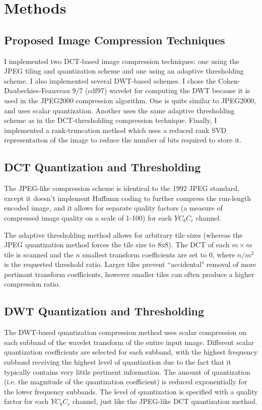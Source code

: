 \documentclass[conference]{IEEEtran}
\begin{document}
\section{Methods}

\subsection{Proposed Image Compression Techniques}

I implemented two DCT-based image compression techniques: one using the JPEG tiling and quantization scheme and one using an adaptive thresholding scheme.
I also implemented several DWT-based schemes.
I chose the Cohen-Daubechies-Feauveau 9/7 (cdf97) wavelet for computing the DWT because it is used in the JPEG2000 compression algorithm.
One is quite similar to JPEG2000, and uses scalar quantization.
Another uses the same adaptive thresholding scheme as in the DCT-thresholding compression technique.
Finally, I implemented a rank-truncation method which uses a reduced rank SVD representaiton of the image to reduce the number of bits required to store it.

\subsection{DCT Quantization and Thresholding}
The JPEG-like compression scheme is identical to the 1992 JPEG standard, except it doesn't implement Huffman coding to further compress the run-length encoded image, and it allows for separate quality factors (a measure of compressed image quality on a scale of 1-100) for each $YC_bC_r$ channel.

The adaptive thresholding method allows for arbitrary tile sizes (whereas the JPEG quantization method forces the tile size to 8x8).
The DCT of each $m\times m$ tile is scanned and the $n$ smallest transform coefficients are set to 0, where $n/m^2$ is the requested threshold ratio.
Larger tiles prevent ``accidental" removal of more pertinant transform coefficients, however smaller tiles can often produce a higher compression ratio.

\subsection{DWT Quantization and Thresholding}
The DWT-based quantization compression method uses scalar compression on each subband of the wavelet transform of the entire input image.
Different scalar quantization coefficients are selected for each subband, with the highest frequency subband receiving the highest level of quantization due to the fact that it typically contains very little pertinent information.
The amount of quantization (i.e. the magnitude of the quantization coefficient) is reduced exponentially for the lower frequency subbands.
The level of quantization is specified with a quality factor for each $YC_bC_r$ channel, just like the JPEG-like DCT quantization method.
\end{document}

